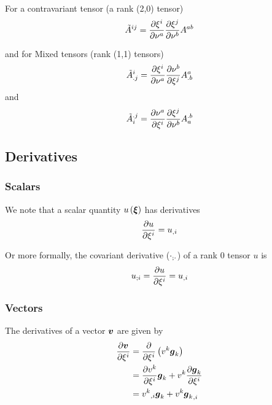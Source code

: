 For a contravariant tensor (a rank (2,0) tensor)
\begin{equation}
  {\tilde{A}}^{ij}= \dfrac{\partial \xi^{i}}{\partial \nu^{a}}  \dfrac{\partial \xi^{j}}{\partial \nu^{b}} A^{ab}
\end{equation}

and for Mixed tensors (rank (1,1) tensors)
\begin{equation}
  {\tilde{A}}^{i}_{.j}= \dfrac{\partial \xi^{i}}{\partial \nu^{a}}  \dfrac{\partial \nu^{b}}{\partial \xi^{j}} A^{a}_{.b}
\end{equation}
and
\begin{equation}
  {\tilde{A}}_{i}^{.j}= \dfrac{\partial \nu^{a}}{\partial \xi^{i}}  \dfrac{\partial \xi^{j}}{\partial \nu^{b}} A_{a}^{.b}
\end{equation}

\subsection{Derivatives}
\label{subsec:function derivatives}

\subsubsection{Scalars}

We note that a scalar quantity $\fnof{u}{\vect{\xi}}$ has derivatives
\begin{equation}
   \dfrac{\partial u}{\partial \xi^{i}} = {u}_{,i} 
\end{equation}

Or more formally, the covariant derivative ($ {\cdot}_{;\cdot} $) of a
rank 0 tensor $u$ is
\begin{equation}
   {u}_{;i} = \dfrac{\partial u}{\partial \xi^{i}} = {u}_{,i} 
\end{equation}

\subsubsection{Vectors}

The derivatives of a vector $\vect{v}$ are given by
\begin{equation}
  \begin{split}
    \delby{\vect{v}}{\xi^{i}} &=
    \delby{}{\xi^{i}}\pbrac{v^{k}\vect{g}_{k}} \\
    &= \delby{v^{k}}{\xi^{i}}\vect{g}_{k}+v^{k}\delby{\vect{g}_{k}}{\xi^{i}} \\
    &= \partialderiv{v^{k}}{i}\vect{g}_{k}+v^{k}\partialderiv{\vect{g}_{k}}{i}
  \end{split}
\end{equation}

